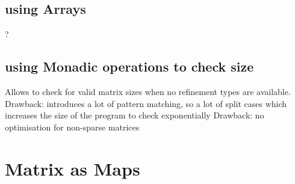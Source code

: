\documentclass[]{article}
\begin{document}
\subsection{using Arrays}
?

\subsection{using Monadic operations to check size}
Allows to check for valid matrix sizes when no refinement types are available. 
Drawback: introduces a lot of pattern matching, so a lot of split cases which increases the size of the program to check exponentially
Drawback: no optimisation for non-sparse matrices

\section{Matrix as Maps}

%
\end{document}
